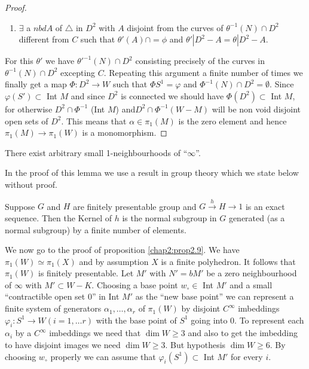\begin{proof}
\begin{enumerate}[(1)]
\item $\exists$ a $nbd A$ of $\bigtriangleup$ in $D^2$ with $A$
  disjoint from the curves of $\theta^{-1} (N) \cap D^2$ different
  from $C$ such that $\theta' (A) \cap = \phi$ and  $\theta' | D^2 - A
  = \theta | D^2 - A$. 
\end{enumerate}
For this $\theta'$ we have $\theta'^{-1} (N) \cap D^2$ consisting
precisely of the curves in $\theta^{-1} (N) \cap D^2$ excepting
$C$. Repeating this argument a finite number of times we finally get a
map $\Phi : D^2\to W$ such that $\Phi S^1 = \varphi$ and $\Phi^{-1}(N)
\cap D^2 =\emptyset$. Since $\varphi (S')\subset$ Int $M$ and since $D^2$
is connected we should have $\Phi  (D^2) \subset$ Int $M$, for
otherwise $D^2 \cap \Phi^{-1}$ (Int $M$) and\pageoriginale $D^2 \cap
\Phi^{-1}(W- M)$ will be non void disjoint open sets of $D^2$. This
means that $\alpha \in \pi_1 (M)$ is the zero element and hence
$\pi_1 (M) \to \pi_1 (W)$ is a monomorphism.  
\end{proof}

\setcounter{prop}{8}
\begin{prop}\label{chap2:prop2.9}%
There exist arbitrary small 1-neighbourhoods of ``$\infty$''. 
\end{prop}

In the proof of this lemma we use a result in group theory which we
state below without proof. 

\setcounter{lemma}{9}
\begin{lemma}\label{chap2:lem2.10}%
Suppose $G$ and $H$ are finitely presentable group and $G
\xrightarrow{h}H \rightarrow 1$ is an exact sequence. Then the Kernel
of $h$ is the normal subgroup in $G$ generated (as a normal subgroup)
by a finite number of elements. 
\end{lemma}

We now go to the proof of proposition \ref{chap2:prop2.9}. We have $\pi_1(W) \simeq
\pi_1 (X)$ and by assumption $X$ is a finite polyhedron. It follows
that $\pi_1 (W)$ is finitely presentable. Let $M'$ with $N' = bM'$  be a
zero neighbourhood of $\infty$ with $M' \subset W-K$. Choosing a base
point $w_\circ \in$ Int $M'$ and a small ``contractible open set 0''
in Int $M'$ as the ``new base point'' we can represent a finite system
of generators $\alpha_1, \ldots, \alpha_r$ of $\pi_1 (W)$ by disjoint
$C^\infty$ imbeddings $\varphi_i : S^1 \to W(i = 1,\ldots r)$ with the
base point of  $S^1$ going into 0. To represent each $\alpha_i$ by a
$C^\infty$ imbeddings we need that $\dim W \geq 3$ and also to get the
imbedding to have disjoint images we need $\dim W \geq 3$. But
hypothesis $\dim W \geq 6$. By choosing $w_\circ$ properly we can assume
that $\varphi_i (S^1) \subset$ Int $M'$ for every $i$. 

